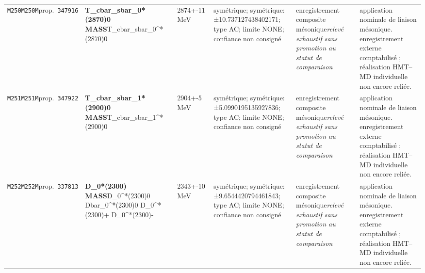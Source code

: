 \begin{landscape}
\begin{longtable}{L{1.85cm}L{4.45cm}L{2.35cm}L{4.05cm}L{3.35cm}L{7.15cm}}
\texttt{M250}\newline \texttt{M250M}\newline prop.\ \texttt{347916} & \textbf{T\_\allowbreak{}cbar\_\allowbreak{}sbar\_\allowbreak{}0*(2870)0 MASS}\newline T\_\allowbreak{}cbar\_\allowbreak{}sbar\_\allowbreak{}0\textasciicircum{}*(2870)0 & 2874+-11\,MeV & symétrique; symétrique: ±10.737127438402171; type AC; limite NONE; confiance non consigné & enregistrement composite mésonique\newline \emph{relevé exhaustif sans promotion au statut de comparaison} & application nominale de liaison mésonique. enregistrement externe comptabilisé ; réalisation HMT--MD individuelle non encore reliée. \\
\texttt{M251}\newline \texttt{M251M}\newline prop.\ \texttt{347922} & \textbf{T\_\allowbreak{}cbar\_\allowbreak{}sbar\_\allowbreak{}1*(2900)0 MASS}\newline T\_\allowbreak{}cbar\_\allowbreak{}sbar\_\allowbreak{}1\textasciicircum{}*(2900)0 & 2904+-5\,MeV & symétrique; symétrique: ±5.0990195135927836; type AC; limite NONE; confiance non consigné & enregistrement composite mésonique\newline \emph{relevé exhaustif sans promotion au statut de comparaison} & application nominale de liaison mésonique. enregistrement externe comptabilisé ; réalisation HMT--MD individuelle non encore reliée. \\
\texttt{M252}\newline \texttt{M252M}\newline prop.\ \texttt{337813} & \textbf{D\_\allowbreak{}0*(2300) MASS}\newline D\_\allowbreak{}0\textasciicircum{}*(2300)0 \textbar{}\allowbreak{} Dbar\_\allowbreak{}0\textasciicircum{}*(2300)0 \textbar{}\allowbreak{} D\_\allowbreak{}0\textasciicircum{}*(2300)+ \textbar{}\allowbreak{} D\_\allowbreak{}0\textasciicircum{}*(2300)- & 2343+-10\,MeV & symétrique; symétrique: ±9.6544420794461843; type AC; limite NONE; confiance non consigné & enregistrement composite mésonique\newline \emph{relevé exhaustif sans promotion au statut de comparaison} & application nominale de liaison mésonique. enregistrement externe comptabilisé ; réalisation HMT--MD individuelle non encore reliée. \\

\end{longtable}
\end{landscape}

